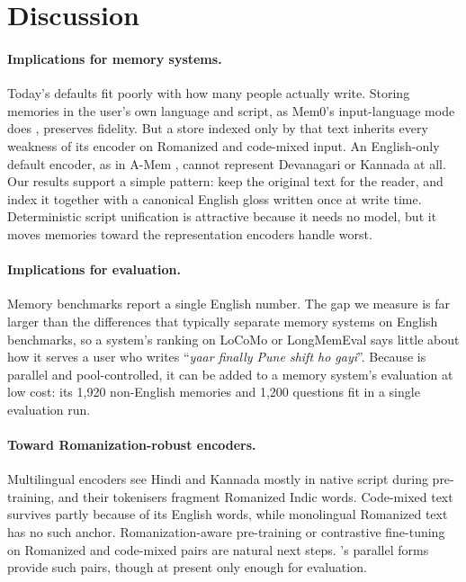 

\section{Discussion}
\label{sec:discussion}

\paragraph{Implications for memory systems.}
Today's defaults fit poorly with how many people actually write. Storing memories in the user's own language and script, as Mem0's input-language mode does \citep{mem0repo}, preserves fidelity. But a store indexed only by that text inherits every weakness of its encoder on Romanized and code-mixed input. An English-only default encoder, as in A-Mem \citep{amemrepo}, cannot represent Devanagari or Kannada at all. Our results support a simple pattern: keep the original text for the reader, and index it together with a canonical English gloss written once at write time. Deterministic script unification is attractive because it needs no model, but it moves memories toward the representation encoders handle worst.

\paragraph{Implications for evaluation.}
Memory benchmarks report a single English number. The gap we measure is far larger than the differences that typically separate memory systems on English benchmarks, so a system's ranking on LoCoMo or LongMemEval says little about how it serves a user who writes ``\emph{yaar finally Pune shift ho gayi}''. Because \lipi{} is parallel and pool-controlled, it can be added to a memory system's evaluation at low cost: its 1{,}920 non-English memories and 1{,}200 questions fit in a single evaluation run.

\paragraph{Toward Romanization-robust encoders.}
Multilingual encoders see Hindi and Kannada mostly in native script during pre-training, and their tokenisers fragment Romanized Indic words. Code-mixed text survives partly because of its English words, while monolingual Romanized text has no such anchor. Romanization-aware pre-training \citep{husain2024romansetu} or contrastive fine-tuning on Romanized and code-mixed pairs are natural next steps. \lipi{}'s parallel forms provide such pairs, though at present only enough for evaluation.

